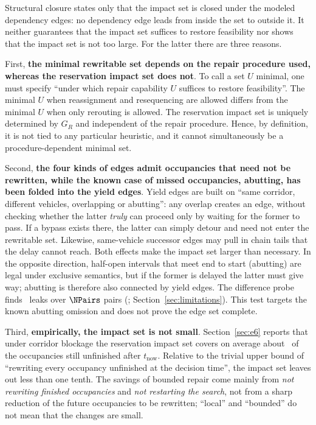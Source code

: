 \begin{remark}
\label{rem:minimality}
Structural closure states only that the impact set is closed under the modeled dependency edges: no dependency edge leads from inside the set to outside it.
It neither guarantees that the impact set suffices to restore feasibility nor shows that the impact set is not too large. For the latter there are three reasons.

First, \textbf{the minimal rewritable set depends on the repair procedure used, whereas the reservation impact set does not}.
To call a set \(U\) minimal, one must specify ``under which repair capability \(U\) suffices to restore feasibility''. The minimal \(U\) when reassignment and resequencing are allowed
differs from the minimal \(U\) when only rerouting is allowed. The reservation impact set is uniquely determined by \(G_R\) and independent of the repair procedure.
Hence, by definition, it is not tied to any particular heuristic, and it cannot simultaneously be a procedure-dependent minimal set.

Second, \textbf{the four kinds of edges admit occupancies that need not be rewritten, while the known case of missed occupancies, abutting, has been folded into the yield edges}.
Yield edges are built on ``same corridor, different vehicles, overlapping or abutting'': any overlap creates an edge, without checking whether the latter \emph{truly}
can proceed only by waiting for the former to pass. If a bypass exists there, the latter can simply detour and need not enter the rewritable set. Likewise, same-vehicle successor edges
may pull in chain tails that the delay cannot reach. Both effects make the impact set larger than necessary.
In the opposite direction, half-open intervals that meet end to start (abutting) are legal under exclusive semantics, but if the former is delayed the latter must give way;
abutting is therefore also connected by yield edges. The difference probe finds \ProbeLeaks\ leaks over \(\NPairs\) pairs (\ProbeLeakPairs;
Section~\ref{sec:limitations}). This test targets the known abutting omission and does not prove the edge set complete.

Third, \textbf{empirically, the impact set is not small}. Section~\ref{sec:e6} reports that under corridor blockage the reservation impact set covers on average about
\ClosureAliveFrac\ of the occupancies still unfinished after \(t_{\mathrm{now}}\). Relative to the trivial upper bound of ``rewriting every occupancy unfinished at the decision time'',
the impact set leaves out less than one tenth. The savings of bounded repair come mainly from \emph{not rewriting finished occupancies} and \emph{not restarting the search},
not from a sharp reduction of the future occupancies to be rewritten; ``local'' and ``bounded'' do not mean that the changes are small.


\end{remark}
